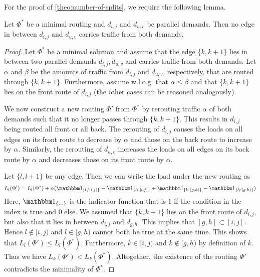 


For the proof of \cref{theo:number-of-splits}, we require the following lemma.
\begin{lemma}
	\label{lemma:parallel-demands}
	Let $\Phi^\ast$ be a minimal routing and $d_{i, j}$ and $d_{u, v}$ be parallel demands.
	Then no edge in between $d_{i, j}$ and $d_{u, v}$ carries traffic from both demands.
\end{lemma}
\begin{proof}
	Let $\Phi^\ast$ be a minimal solution and assume that the edge $\{k, k+1\}$ lies in between two parallel demands $d_{i, j}, d_{u, v}$ and carries traffic from both demands.
	Let $\alpha$ and $\beta$ be the amounts of traffic from $d_{i,j}$ and $d_{u, v}$, respectively, that are routed through $\{k, k+1\}$.
	Furthermore, assume w.l.o.g. that $\alpha \leq \beta$ and that $\{k, k+1\}$ lies on the front route of $d_{i, j}$ (the other cases can be reasoned analogously).
	
	We now construct a new routing $\Phi'$ from $\Phi^\ast$ by rerouting traffic $\alpha$ of both demands such that it no longer passes through $\{k, k+1\}$.
	This results in $d_{i, j}$ being routed all front or all back.
	The rerouting of $d_{i, j}$ causes the loads on all edges on its front route to decrease by $\alpha$ and those on the back route to increase by $\alpha$.
	Similarly, the rerouting of $d_{u, v}$ increases the loads on all edges on its back route by $\alpha$ and decreases those on its front route by $\alpha$.
	
	Let $\{l, l+1\}$ be any edge.
	Then we can write the load under the new routing as
	\begin{equation}
	L_l(\Phi') = L_l(\Phi^\ast) 
	+ \alpha (\dOne_{\{l \notin [i, j)\}} - \dOne_{\{l \in [i, j)\}} +  \dOne_{\{l \in [g, h)\}} - \dOne_{\{l \notin [g, h)\}} )
	\end{equation}
	Here, $\dOne_{\{\ldots\}}$ is the indicator function that is $1$ if the condition in the index is true and $0$ else.
	We assumed that $\{k, k+1\}$ lies on the front route of $d_{i, j}$, but also that it lies in between $d_{i, j}$ and $d_{g, h}$.
	This implies that $[g, h] \subset [i, j]$.
	Hence $l \notin [i, j)$ and $l \in [g, h)$ cannot both be true at the same time.
	This shows that $L_l(\Phi') \leq L_l(\Phi^\ast)$.
	Furthermore, $k \in [i, j)$ and $k \notin [g, h)$ by definition of $k$.
	Thus we have $L_k(\Phi') < L_k(\Phi^\ast)$.
	Altogether, the existence of the routing $\Phi'$ contradicts the minimality of $\Phi^\ast$.
\end{proof}


